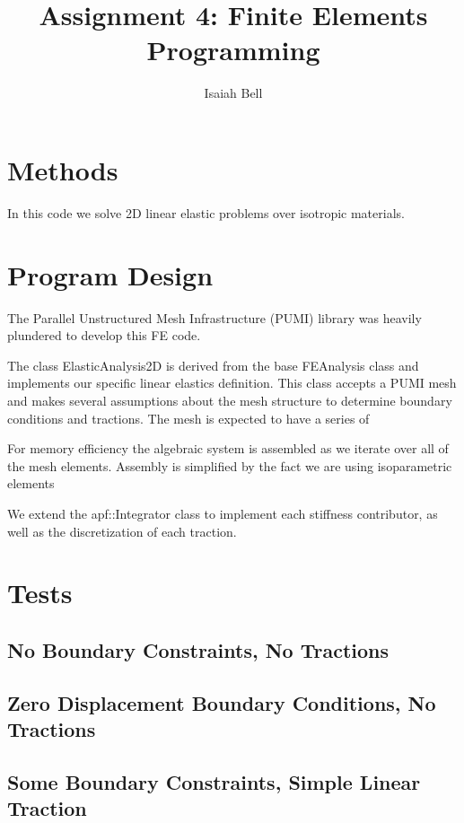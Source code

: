 \documentclass{article}
\begin{document}
\title{Assignment 4: Finite Elements Programming}
\author{Isaiah Bell} 
\maketitle

\section{Methods}

In this code we solve 2D linear elastic problems over isotropic materials.


\section{Program Design}

The Parallel Unstructured Mesh Infrastructure (PUMI) library was heavily plundered to develop this FE code.

The class ElasticAnalysis2D is derived from the base FEAnalysis class and implements
our specific linear elastics definition. This class accepts a PUMI mesh and makes
several assumptions about the mesh structure to determine boundary conditions and
tractions. The mesh is expected to have a series of  

For memory efficiency the algebraic system is assembled as we iterate over all of the
mesh elements. Assembly is simplified by the fact we are using isoparametric elements

We extend the apf::Integrator class to implement each stiffness contributor, as well as the discretization of each traction.


\section{Tests}

\subsection{No Boundary Constraints, No Tractions}


\subsection{Zero Displacement Boundary Conditions, No Tractions}


\subsection{Some Boundary Constraints, Simple Linear Traction}
\end{document}

